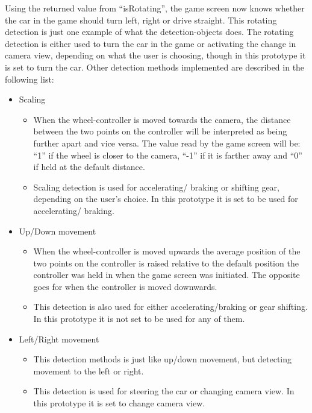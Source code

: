 Using the returned value from “isRotating”, the game screen now knows whether the car in the game should turn left, right or drive straight. 
This rotating detection is just one example of what the detection-objects does. 
The rotating detection is either used to turn the car in the game or activating the change in camera view, depending on what the user is choosing, though in this prototype it is set to turn the car. 
Other detection methods implemented are described in the following list:

\pagebreak[4]
\begin{itemize}
\item Scaling
	\begin{itemize}
	\item When the wheel-controller is moved towards the camera, the distance between the two points on the controller will be interpreted as being further apart and vice versa. The value read by the game screen will be: “1” if the wheel is closer to the camera, “-1” if it is farther away and “0” if held at the default distance.
	
	\item Scaling detection is used for accelerating/ braking or shifting gear, depending on the user’s choice. In this prototype it is set to be used for accelerating/ braking.
	\end{itemize}
	
\item Up/Down movement
	\begin{itemize}
	\item When the wheel-controller is moved upwards the average position of the two points on the controller is raised relative to the default position the controller was held in when the game screen was initiated. The opposite goes for when the controller is moved downwards.
	
	\item This detection is also used for either accelerating/braking or gear shifting. In this prototype it is not set to be used for any of them.

	\end{itemize}
	
\item Left/Right movement
	\begin{itemize}
	\item This detection methods is just like up/down movement, but detecting movement to the left or right.
	
	\item This detection is used for steering the car or changing camera view. In this prototype it is set to change camera view.
	\end{itemize}
	

\end{itemize}
